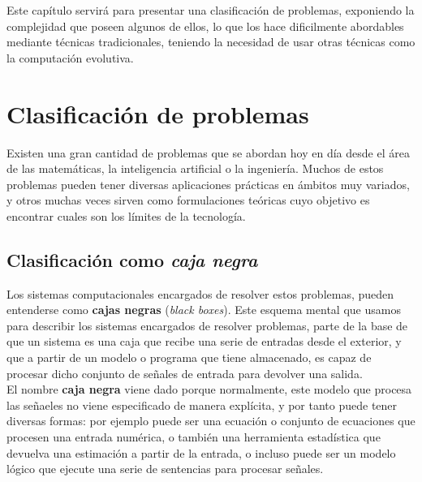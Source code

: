 
Este capítulo servirá para presentar una clasificación de problemas, exponiendo la complejidad que poseen algunos de ellos, lo que los hace dificilmente abordables mediante técnicas tradicionales, teniendo la necesidad de usar otras técnicas como la computación evolutiva.

\section{Clasificación de problemas}
\label{1:sec:1}

Existen una gran cantidad de problemas que se abordan hoy en día desde el área de las matemáticas, la inteligencia artificial o la ingeniería. Muchos de estos problemas pueden tener diversas aplicaciones prácticas en ámbitos muy variados, y otros muchas veces sirven como formulaciones teóricas cuyo objetivo es encontrar cuales son los límites de la tecnología. \\

\subsection{Clasificación como \textit{caja negra}}

Los sistemas computacionales encargados de resolver estos problemas, pueden entenderse como \textbf{cajas negras} (\textit{black boxes}). Este esquema mental que usamos para describir los sistemas encargados de resolver problemas, parte de la base de que un sistema es una caja que recibe una serie de entradas desde el exterior, y que a partir de un modelo o programa que tiene almacenado, es capaz de procesar dicho conjunto de señales de entrada para devolver una salida. \\

El nombre \textbf{caja negra} viene dado porque normalmente, este modelo que procesa las señaeles no viene especificado de manera explícita, y por tanto puede tener diversas formas: por ejemplo puede ser una ecuación o conjunto de ecuaciones que procesen una entrada numérica, o también una herramienta estadística que devuelva una estimación a partir de la entrada, o incluso puede ser un modelo lógico que ejecute una serie de sentencias para procesar señales. \\

